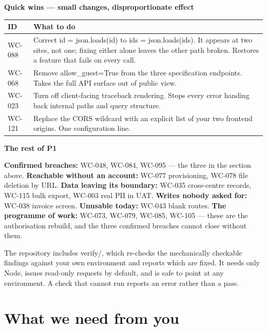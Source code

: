 \documentclass[10pt,a4paper]{article}
\newcommand{\display}{\sffamily}
\newcommand{\code}[1]{{\ttfamily #1}}
\begin{document}
\vspace{0.4em}
{\display\small\bfseries\color{accent}Quick wins — small changes, disproportionate effect}\\[0.35em]
\begin{tabularx}{\textwidth}{@{}l>{\raggedright\arraybackslash}X@{}}
\toprule
\textbf{ID} & \textbf{What to do} \\
\midrule
WC-088 & Correct \code{id = json.loads(id)} to \code{ids = json.loads(ids)}. It appears at two sites, not one; fixing either alone leaves the other path broken. Restores a feature that fails on every call. \\
WC-068 & Remove \code{allow\_guest=True} from the three specification endpoints. Takes the full API surface out of public view. \\
WC-023 & Turn off client-facing traceback rendering. Stops every error handing back internal paths and query structure. \\
WC-121 & Replace the CORS wildcard with an explicit list of your two frontend origins. One configuration line. \\
\bottomrule
\end{tabularx}

\vspace{0.5em}
{\display\small\bfseries\color{accent}The rest of P1}\\[0.35em]
{\footnotesize\raggedright
\textbf{Confirmed breaches:} WC-048, WC-084, WC-095 — the three in the section above.\quad
\textbf{Reachable without an account:} WC-077 provisioning, WC-078 file deletion by URL.\quad
\textbf{Data leaving its boundary:} WC-035 cross-centre records, WC-115 bulk export, WC-003 real PII in UAT.\quad
\textbf{Writes nobody asked for:} WC-038 invoice screen.\quad
\textbf{Unusable today:} WC-043 blank routes.\quad
\textbf{The programme of work:} WC-073, WC-079, WC-085, WC-105 — these are the authorisation rebuild, and the three confirmed breaches cannot close without them.\par}

\vspace{0.5em}
{\footnotesize\color{muted}\raggedright
The repository includes \code{verify/}, which re-checks the mechanically checkable findings against
your own environment and reports which are fixed. It needs only Node, issues read-only requests by
default, and is safe to point at any environment. A check that cannot run reports an error rather
than a pass.\par}

\section{What we need from you}
\end{document}
